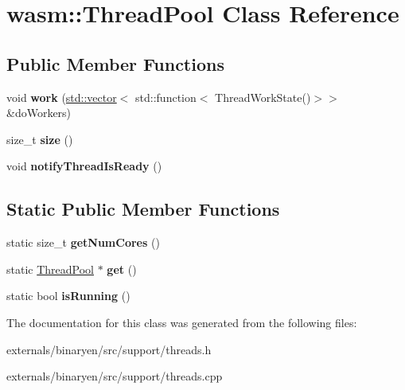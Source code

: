 \hypertarget{classwasm_1_1_thread_pool}{}\section{wasm\+:\+:Thread\+Pool Class Reference}
\label{classwasm_1_1_thread_pool}
\subsection*{Public Member Functions}
\begin{DoxyCompactItemize}
\item 
\mbox{\label{classwasm_1_1_thread_pool_a248f1d9973a2117b08f01e7023213f67}} 
void {\bfseries work} (\mbox{\hyperlink{classstd_1_1vector}{std\+::vector}}$<$ std\+::function$<$ Thread\+Work\+State()$>$$>$ \&do\+Workers)
\item 
\mbox{\label{classwasm_1_1_thread_pool_a065216304849d4e6190a6d3aad8fea08}} 
size\+\_\+t {\bfseries size} ()
\item 
\mbox{\label{classwasm_1_1_thread_pool_a14385b757c86fdb9409ccac22baa33b7}} 
void {\bfseries notify\+Thread\+Is\+Ready} ()
\end{DoxyCompactItemize}
\subsection*{Static Public Member Functions}
\begin{DoxyCompactItemize}
\item 
\mbox{\label{classwasm_1_1_thread_pool_a5c420394b5662aeb1eefa15a6eaea391}} 
static size\+\_\+t {\bfseries get\+Num\+Cores} ()
\item 
\mbox{\label{classwasm_1_1_thread_pool_a712876640260fdca20938d8b16d88034}} 
static \mbox{\hyperlink{classwasm_1_1_thread_pool}{Thread\+Pool}} $\ast$ {\bfseries get} ()
\item 
\mbox{\label{classwasm_1_1_thread_pool_a0785b7b3e8cc1dbddfec91f81c7c5184}} 
static bool {\bfseries is\+Running} ()
\end{DoxyCompactItemize}


The documentation for this class was generated from the following files\+:\begin{DoxyCompactItemize}
\item 
externals/binaryen/src/support/threads.\+h\item 
externals/binaryen/src/support/threads.\+cpp\end{DoxyCompactItemize}
